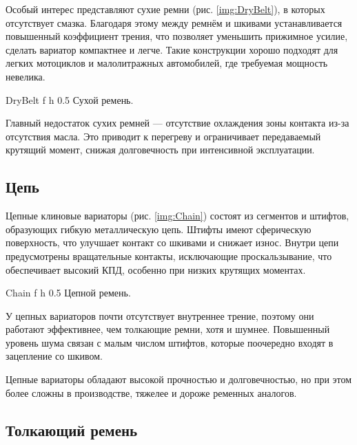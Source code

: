 Особый интерес представляют сухие ремни (рис. \ref{img:DryBelt}), в которых отсутствует смазка. Благодаря этому между ремнём и шкивами устанавливается повышенный коэффициент трения, что позволяет уменьшить прижимное усилие, сделать вариатор компактнее и легче. Такие конструкции хорошо подходят для легких мотоциклов и малолитражных автомобилей, где требуемая мощность невелика.

    {DryBelt} %
    {f} %
    {h} %
    {0.5\textwidth} %
    {Сухой ремень.} %

Главный недостаток сухих ремней — отсутствие охлаждения зоны контакта из-за отсутствия масла. Это приводит к перегреву и ограничивает передаваемый крутящий момент, снижая долговечность при интенсивной эксплуатации.

\subsection{Цепь}

Цепные клиновые вариаторы (рис. \ref{img:Chain}) состоят из сегментов и штифтов, образующих гибкую металлическую цепь. Штифты имеют сферическую поверхность, что улучшает контакт со шкивами и снижает износ. Внутри цепи предусмотрены вращательные контакты, исключающие проскальзывание, что обеспечивает высокий КПД, особенно при низких крутящих моментах.

    {Chain} %
    {f} %
    {h} %
    {0.5\textwidth} %
    {Цепной ремень.} %

У цепных вариаторов почти отсутствует внутреннее трение, поэтому они работают эффективнее, чем толкающие ремни, хотя и шумнее. Повышенный уровень шума связан с малым числом штифтов, которые поочередно входят в зацепление со шкивом.

Цепные вариаторы обладают высокой прочностью и долговечностью, но при этом более сложны в производстве, тяжелее и дороже ременных аналогов.

\subsection{Толкающий ремень}

